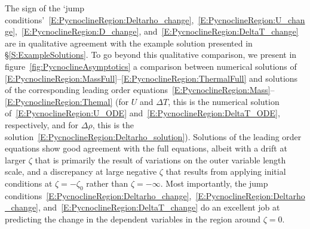 \documentclass{jfm}
\begin{document}
The sign of the `jump conditions'~\eqref{E:PycnoclineRegion:Deltarho_change},~\eqref{E:PycnoclineRegion:U_change},~\eqref{E:PycnoclineRegion:D_change}, and~\eqref{E:PycnoclineRegion:DeltaT_change} are in qualitative agreement with the example solution presented in \S\ref{S:ExampleSolutions}. To go beyond this qualitative comparison, we present in figure~\ref{fig:PycnoclineAsymptotics} a comparison between numerical solutions of \eqref{E:PycnoclineRegion:MassFull}--\eqref{E:PycnoclineRegion:ThermalFull} and solutions of the corresponding leading order equations~\eqref{E:PycnoclineRegion:Mass}--\eqref{E:PycnoclineRegion:Themal}  (for $U$ and $\Delta T$, this is the numerical solution of~\eqref{E:PycnoclineRegion:U_ODE} and~\eqref{E:PycnoclineRegion:DeltaT_ODE}, respectively, and for $\Delta \rho$, this is the solution~\eqref{E:PycnoclineRegion:Deltarho_solution}). Solutions of the leading order equations show good agreement with the full equations, albeit with a drift at larger $\zeta$ that is primarily the result of variations on the outer variable length scale, and a discrepancy at large negative $\zeta$ that results from applying  initial conditions at $\zeta = -\zeta_0$ rather than $\zeta = -\infty$. Most importantly, the jump conditions~\eqref{E:PycnoclineRegion:Deltarho_change},~\eqref{E:PycnoclineRegion:Deltarho_change}, and~\eqref{E:PycnoclineRegion:DeltaT_change} do an excellent job at predicting the change in the dependent variables in the region around $\zeta = 0$.

\end{document}
